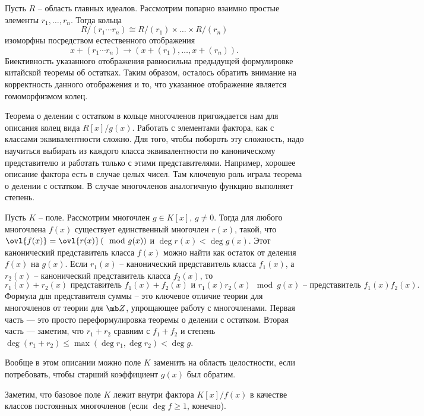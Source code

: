  Пусть $R$ -- область главных идеалов. Рассмотрим попарно взаимно простые элементы $r_1,\dots,r_n$. Тогда кольца
$$R/(r_1 \cdots r_n) \cong R/(r_1) \times\dots \times R/(r_n)$$
изоморфны посредством естественного отображения
$$ x +(r_1\cdots r_n) \to \left(x+(r_1),\dots,x+(r_n)\right).$$
\ecrl 
\proof Биективность указанного отображения равносильна предыдущей формулировке китайской теоремы об остатках. Таким образом, осталось обратить внимание на корректность данного отображения и то, что указанное отображение является гомоморфизмом колец. 
\endproof



Теорема о делении с остатком в кольце многочленов  пригождается нам для описания колец вида $R[x]/g(x)$. Работать с элементами фактора, как с классами эквивалентности сложно. Для того, чтобы побороть эту сложность, надо научиться выбирать из каждого класса эквивалентности по каноническому представителю и работать только с этими представителями. Например, хорошее описание фактора есть в случае  целых чисел. Там ключевую роль играла теорема о делении с остатком. В случае многочленов аналогичную функцию выполняет степень.


 Пусть $K$ -- поле. Рассмотрим многочлен $g \in K[x]$, $g\neq 0$. Тогда для любого многочлена $f(x)$ существует единственный многочлен $r(x)$, такой, что $\ovl{f(x)}=\ovl{r(x)} \,(\mod g(x))$ и $\deg r(x) < \deg g(x)$.
Этот канонический представитель класса $f(x)$ можно найти как остаток от деления $f(x)$ на  $g(x)$. Если $r_1(x)$ -- канонический представитель класса $f_1(x)$, а $r_2(x)$ -- канонический представитель класса $f_2(x)$, то 
$$r_1(x)+r_2(x) \text{ представитель  $f_1(x)+f_2(x)$ и } r_1(x)r_2(x) \mod g(x) \text{ -- представитель } f_1(x)f_2(x).$$
Формула для представителя суммы -- это ключевое отличие теории для многочленов от теории для $\mb Z$, упрощающее работу с многочленами.
\ethrm
\proof
Первая часть --- это просто переформулировка теоремы о делении с остатком. Вторая часть --- заметим, что $r_1+r_2$ сравним с $f_1+f_2$ и степень $\deg(r_1+r_2)\leq \max(\deg r_1, \deg r_2) < \deg g$.
\endproof

\rm Вообще в этом описании можно поле $K$ заменить на область целостности, если потребовать, чтобы старший коэффициент $g(x)$ был обратим.
\erm


\rm Заметим, что базовое поле $K$ лежит внутри фактора $K[x]/f(x)$  в качестве классов постоянных многочленов (если $\deg f\geq 1$, конечно).
\erm




